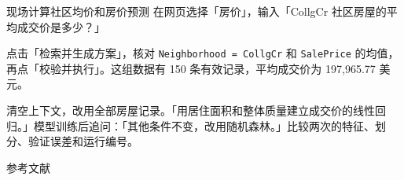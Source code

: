 \documentclass[aspectratio=169,11pt]{beamer}
\newcommand{\code}[1]{\nolinkurl{#1}}
\newcommand{\smallnote}[1]{\par\vspace{1.5mm}{\scriptsize #1\par}}
\begin{document}
\begin{frame}{现场计算社区均价和房价预测}
在网页选择「房价」，输入「CollgCr 社区房屋的平均成交价是多少？」
\par\medskip
点击「检索并生成方案」，核对 \code{Neighborhood = CollgCr} 和 \code{SalePrice} 的均值，再点「校验并执行」。这组数据有 150 条有效记录，平均成交价为 197,965.77 美元。
\par\medskip
清空上下文，改用全部房屋记录。「用居住面积和整体质量建立成交价的线性回归。」模型训练后追问：「其他条件不变，改用随机森林。」比较两次的特征、划分、验证误差和运行编号。
\smallnote{远程汇报可共享浏览器窗口；保持网络连接以生成新方案，计算结果和文件在本机查看。}
\end{frame}

\begin{frame}[allowframebreaks]{参考文献}
\tiny


\end{frame}
\end{document}
